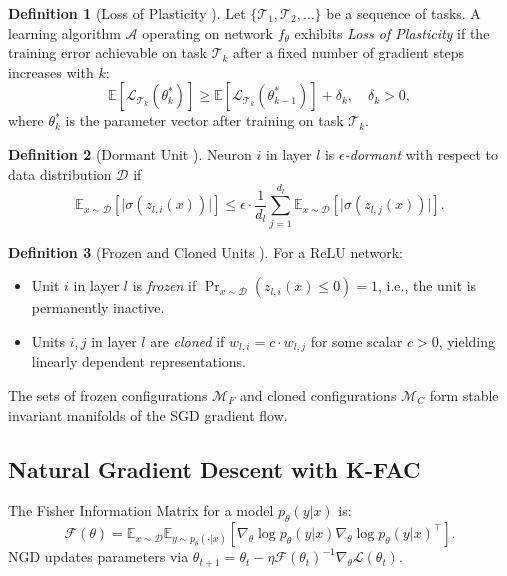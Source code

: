 \documentclass{article}
\providecommand{\E}{\mathbb{E}}
\providecommand{\FIM}{\mathcal{F}}
\providecommand{\abs}[1]{\lvert #1 \rvert}
\theoremstyle{plain}
\theoremstyle{definition}
\newtheorem{definition}{Definition}
\theoremstyle{remark}
\begin{document}
\begin{definition}[Loss of Plasticity \citep{dohare2024loss}]
\label{def:lop}
Let $\{\mathcal{T}_1, \mathcal{T}_2, \ldots\}$ be a sequence of tasks. A learning algorithm $\mathcal{A}$ operating on network $f_\theta$ exhibits \emph{Loss of Plasticity} if the training error achievable on task $\mathcal{T}_k$ after a fixed number of gradient steps increases with $k$:
\begin{equation}
    \E[\mathcal{L}_{\mathcal{T}_k}(\theta_k^*)] \geq \E[\mathcal{L}_{\mathcal{T}_k}(\theta_{k-1}^*)] + \delta_k, \quad \delta_k > 0,
\end{equation}
where $\theta_k^*$ is the parameter vector after training on task $\mathcal{T}_k$.
\end{definition}

\begin{definition}[Dormant Unit \citep{sokar2023dormant}]
\label{def:dormant}
Neuron $i$ in layer $l$ is $\epsilon$\emph{-dormant} with respect to data distribution $\mathcal{D}$ if
\begin{equation}
    \E_{x \sim \mathcal{D}}\left[\abs{\sigma(z_{l,i}(x))}\right] \leq \epsilon \cdot \frac{1}{d_l}\sum_{j=1}^{d_l} \E_{x \sim \mathcal{D}}\left[\abs{\sigma(z_{l,j}(x))}\right].
\end{equation}
\end{definition}

\begin{definition}[Frozen and Cloned Units \citep{joudaki2026barriers}]
\label{def:barriers}
For a ReLU network:
\begin{itemize}
    \item Unit $i$ in layer $l$ is \emph{frozen} if $\Pr_{x \sim \mathcal{D}}(z_{l,i}(x) \leq 0) = 1$, i.e., the unit is permanently inactive.
    \item Units $i, j$ in layer $l$ are \emph{cloned} if $w_{l,i} = c \cdot w_{l,j}$ for some scalar $c > 0$, yielding linearly dependent representations.
\end{itemize}
The sets of frozen configurations $\mathcal{M}_F$ and cloned configurations $\mathcal{M}_C$ form stable invariant manifolds of the SGD gradient flow.
\end{definition}

\subsection{Natural Gradient Descent with K-FAC}

The Fisher Information Matrix for a model $p_\theta(y|x)$ is:
\begin{equation}
    \FIM(\theta) = \E_{x \sim \mathcal{D}}\E_{y \sim p_\theta(\cdot|x)}\left[\nabla_\theta \log p_\theta(y|x) \nabla_\theta \log p_\theta(y|x)^\top\right].
\end{equation}
NGD updates parameters via $\theta_{t+1} = \theta_t - \eta \FIM(\theta_t)^{-1} \nabla_\theta \mathcal{L}(\theta_t)$.
\end{document}
